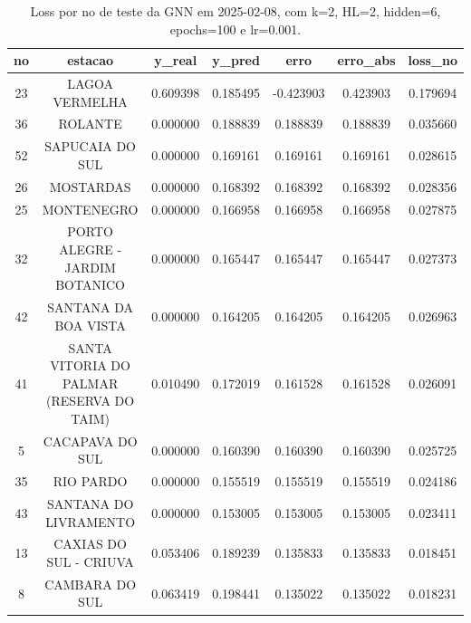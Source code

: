 \begin{table}[h]
\centering
\caption{Loss por no de teste da GNN em 2025-02-08, com k=2, HL=2, hidden=6, epochs=100 e lr=0.001.}
\label{tab:gnn_loss_k2_hl2_h6_e100_d20250208}
\begin{tabular}{ccccccc}
\toprule
no & estacao & y\_real & y\_pred & erro & erro\_abs & loss\_no \\
\midrule
23 & LAGOA VERMELHA & 0.609398 & 0.185495 & -0.423903 & 0.423903 & 0.179694 \\
36 & ROLANTE & 0.000000 & 0.188839 & 0.188839 & 0.188839 & 0.035660 \\
52 & SAPUCAIA DO SUL & 0.000000 & 0.169161 & 0.169161 & 0.169161 & 0.028615 \\
26 & MOSTARDAS & 0.000000 & 0.168392 & 0.168392 & 0.168392 & 0.028356 \\
25 & MONTENEGRO & 0.000000 & 0.166958 & 0.166958 & 0.166958 & 0.027875 \\
32 & PORTO ALEGRE - JARDIM BOTANICO & 0.000000 & 0.165447 & 0.165447 & 0.165447 & 0.027373 \\
42 & SANTANA DA BOA VISTA & 0.000000 & 0.164205 & 0.164205 & 0.164205 & 0.026963 \\
41 & SANTA VITORIA DO PALMAR (RESERVA DO TAIM) & 0.010490 & 0.172019 & 0.161528 & 0.161528 & 0.026091 \\
5 & CACAPAVA DO SUL & 0.000000 & 0.160390 & 0.160390 & 0.160390 & 0.025725 \\
35 & RIO PARDO & 0.000000 & 0.155519 & 0.155519 & 0.155519 & 0.024186 \\
43 & SANTANA DO LIVRAMENTO & 0.000000 & 0.153005 & 0.153005 & 0.153005 & 0.023411 \\
13 & CAXIAS DO SUL - CRIUVA & 0.053406 & 0.189239 & 0.135833 & 0.135833 & 0.018451 \\
8 & CAMBARA DO SUL & 0.063419 & 0.198441 & 0.135022 & 0.135022 & 0.018231 \\
\bottomrule
\end{tabular}
\end{table}
